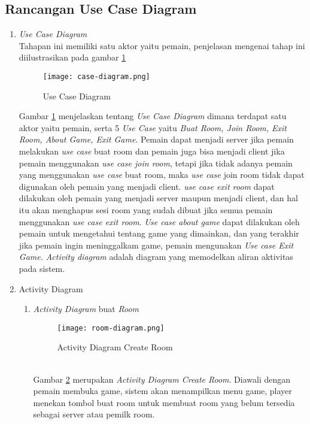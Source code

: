 \subsection{Rancangan Use Case Diagram}
\begin{enumerate}
    \item \textit{Use Case Diagram}
    \\ Tahapan ini memiliki satu aktor yaitu pemain, penjelasan mengenai tahap ini diilustrasikan pada gambar \ref{fig:case-diagram}
    \begin{figure}[h]
        \centering
        \texttt{[image: case-diagram.png]}
        \caption{Use Case Diagram}
        \label{fig:case-diagram}
    \end{figure}

    Gambar \ref{fig:case-diagram} menjelaskan tentang \textit{Use Case Diagram} dimana terdapat satu aktor yaitu pemain, serta 5 \textit{Use Case} yaitu \textit{Buat Room, Join Room, Exit Room, About Game, Exit Game}.
    Pemain dapat menjadi server jika pemain melakukan \textit{use case} buat room dan pemain juga bisa menjadi client jika pemain menggunakan \textit{use case join room}, tetapi jika tidak adanya pemain yang menggunakan \textit{use case} buat room, maka \textit{use case} join room tidak dapat digunakan oleh pemain yang menjadi client.
    \textit{use case exit room} dapat dilakukan oleh pemain yang menjadi server maupun menjadi client, dan hal itu akan menghapus sesi room yang sudah dibuat jika semua pemain menggunakan \textit{use case exit room}. \textit{Use case about game} dapat dilakukan oleh pemain untuk mengetahui tentang game yang dimainkan, dan yang terakhir jika pemain ingin meninggalkam game, pemain mengunakan \textit{Use case Exit Game.}
    \textit{Activity diagram} adalah diagram yang memodelkan aliran aktivitas pada sistem.
    \item Activity Diagram
    \begin{enumerate}
        \item \textit{Activity Diagram} buat \textit{Room}
        \begin{figure}[h]
           \centering
           \texttt{[image: room-diagram.png]}
           \caption{Activity Diagram Create Room}
           \label{fig:croom-case}
       \end{figure}
       \\ Gambar \ref{fig:croom-case} merupakan \textit{Activity Diagram Create Room}. Diawali dengan pemain membuka game, sistem akan menampilkan menu game, player menekan tombol buat room untuk membuat room yang belum tersedia sebagai server atau pemilk room.

\end{enumerate}
\end{enumerate}
